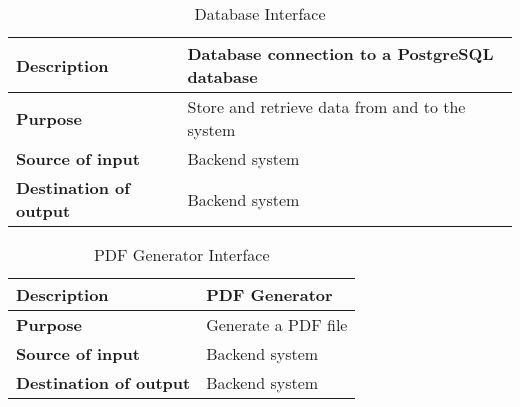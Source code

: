 \begin{table}[h!]
	\centering
	\caption{Database Interface}
	\label{db_interface_table}
	\begin{tabularx}{\textwidth}{l l}
		\hline
		\textbf{Description}           & Database connection to a PostgreSQL database                           \\ \hline
		\textbf{Purpose}               & Store and retrieve data from and to the system \\ \hline
		\textbf{Source of input}       & Backend system                                 \\ \hline
		\textbf{Destination of output} & Backend system                                 \\ \hline
	\end{tabularx}
\end{table}

\begin{table}[h!]
	\centering
	\caption{PDF Generator Interface}
	\label{pdf_interface_table}
	\begin{tabularx}{\textwidth}{l l}
		\hline
		\textbf{Description}           & PDF Generator       \\ \hline
		\textbf{Purpose}               & Generate a PDF file \\ \hline
		\textbf{Source of input}       & Backend system      \\ \hline
		\textbf{Destination of output} & Backend system      \\ \hline
	\end{tabularx}
\end{table}


